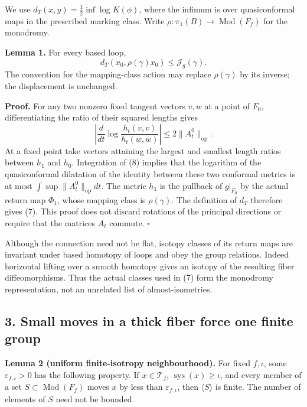 \documentclass[
  11pt,
]{article}
\begin{document}
We use \(d_T(x,y)=\frac12\inf\log K(\phi)\), where the infimum is over
quasiconformal maps in the prescribed marking class. Write
\(\rho:\pi_1(B)\to\operatorname{Mod}(F_f)\) for the monodromy.

\textbf{Lemma 1.} For every based loop, \[
                    d_T(x_0,\rho(\gamma)x_0)
                          \le\mathcal J_g(\gamma).
\tag{7}
\] The convention for the mapping-class action may replace
\(\rho(\gamma)\) by its inverse; the displacement is unchanged.

\textbf{Proof.} For any two nonzero fixed tangent vectors \(v,w\) at a
point of \(F_0\), differentiating the ratio of their squared lengths
gives \[
 \left|\frac d{dt}\log\frac{h_t(v,v)}{h_t(w,w)}\right|
                    \le2\|A_t^0\|_{\mathrm{op}}.
\tag{8}
\] At a fixed point take vectors attaining the largest and smallest
length ratios between \(h_1\) and \(h_0\). Integration of (8) implies
that the logarithm of the quasiconformal dilatation of the identity
between these two conformal metrics is at most
\(\int\sup\|A_t^0\|_{\mathrm{op}}dt\). The metric \(h_1\) is the
pullback of \(g|_{F_0}\) by the actual return map \(\Phi_1\), whose
mapping class is \(\rho(\gamma)\). The definition of \(d_T\) therefore
gives (7). This proof does not discard rotations of the principal
directions or require that the matrices \(A_t\) commute. \(\square\)

Although the connection need not be flat, isotopy classes of its return
maps are invariant under based homotopy of loops and obey the group
relations. Indeed horizontal lifting over a smooth homotopy gives an
isotopy of the resulting fiber diffeomorphisms. Thus the actual classes
used in (7) form the monodromy representation, not an unrelated list of
almost-isometries.

\hypertarget{small-moves-in-a-thick-fiber-force-one-finite-group}{%
\subsection{3. Small moves in a thick fiber force one finite
group}\label{small-moves-in-a-thick-fiber-force-one-finite-group}}

\textbf{Lemma 2 (uniform finite-isotropy neighbourhood).} For fixed
\(f,\iota\), some \(\varepsilon_{f,\iota}>0\) has the following
property. If \(x\in\mathcal T_f\), \(\operatorname{sys}(x)\ge\iota\),
and every member of a set \(S\subset\operatorname{Mod}(F_f)\) moves
\(x\) by less than \(\varepsilon_{f,\iota}\), then \(\langle S\rangle\)
is finite. The number of elements of \(S\) need not be bounded.
\end{document}
